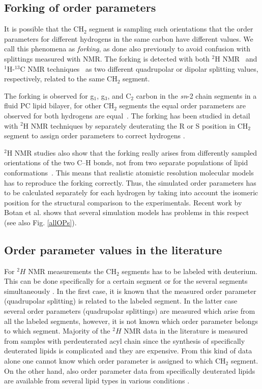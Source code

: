 \documentclass[aps,prl,superscriptaddress,twocolumn]{revtex4}
\begin{document}
\subsection{Forking of order parameters}

It is possible that the CH$_2$ segment is sampling such orientations that the order parameters
for different hydrogens in the same carbon have different values. We call this phenomena as 
{\it forking}, as done also previously to avoid confusion with splittings measured with NMR.
The forking is detected with both $^2$H NMR~\cite{seelig75,seelig78,engel81,gally81} and 
$^1$H-$^{13}$C NMR techniques~\cite{??} as two different quadrupolar or dipolar splitting values,
respectively, related to the same CH$_2$ segment.

The forking is observed for g$_1$, g$_3$, and  C$_2$ carbon in the \textit{sn}-2 chain segments in
a fluid PC lipid bilayer, for other CH$_2$ segments the equal order parameters are observed for 
both hydrogens are equal~\cite{seelig74,seelig77,seelig78,gally81,ferreira13,??}.
The forking has been studied in detail with $^2$H NMR techniques by separately deuterating the 
R or S position in CH$_2$ segment to assign order parameters to correct hydrogens \cite{gally81}.

$^2$H NMR studies also show that the forking really arises from differently sampled orientations 
of the two C--H bonds, not from two separate populations of lipid conformations~\cite{engel81,gally81}.
This means that realistic atomistic resolution molecular models has to reproduce the forking 
correctly. Thus, the simulated order parameters has to be calculated separately for each hydrogen
by taking into account the isomeric position for the structural comparison to the experimentals.
Recent work by Botan et al. shows that several simulation models has problems in this respect \cite{botan15}
(see also Fig. \ref{allOPs}). 


\subsection{Order parameter values in the literature}
For $^2H$ NMR measurements the CH$_2$ segments has to be labeled with deuterium.
This can be done specifically for a certain segment or for the several segments
simultaneously \cite{??}. In the first case, it is known that the measured
order parameter (quadrupolar splitting) is related to the labeled segment.
In the latter case several order parameters (quadrupolar splittings) are
measured which arise from all the labeled segments, however, it is not known 
which order parameter belongs to which segment. Majority of the $^2H$ NMR data
in the literature is measured from samples with perdeuterated acyl chain \cite{leftin11}
since the synthesis of specifically deuterated lipids is complicated \cite{??} and they are expensive.
From this kind of data alone one cannot know which order parameter is assigned
to which CH$_2$ segment. On the other hand, also order parameter data from specifically 
deuterated lipids are available from several lipid types in various 
conditions \cite{seelig74,seelig75,seelig77,seelig78,gally81}.
\end{document}
